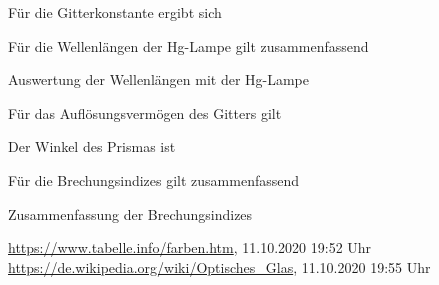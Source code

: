 \documentclass{article}
\begin{document}
Für die Gitterkonstante ergibt sich


Für die Wellenlängen der Hg-Lampe gilt zusammenfassend
\begin{table}[H]
\caption{Auswertung der Wellenlängen mit der Hg-Lampe}
\centering

\end{table}

Für das Auflösungsvermögen des Gitters gilt


Der Winkel des Prismas ist



Für die Brechungsindizes gilt zusammenfassend
\begin{table}[H]
\caption{Zusammenfassung der Brechungsindizes}
\centering

\end{table}





\begin{thebibliography}{9}
 \url{https://www.tabelle.info/farben.htm}, 11.10.2020 19:52 Uhr
 \url{https://de.wikipedia.org/wiki/Optisches_Glas}, 11.10.2020 19:55 Uhr
\end{thebibliography}






%

%


%
\end{document}
